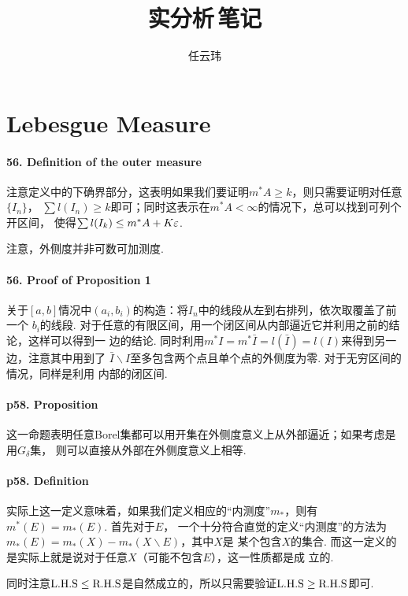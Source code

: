 

\title{实分析$\,$笔记}
\author{任云玮}
\date{}



\maketitle
\tableofcontents

\newpage
\setcounter{section}{2}
\section{Lebesgue Measure}
  \paragraph{56. Definition of the outer measure}
    注意定义中的下确界部分，这表明如果我们要证明$m^*A\ge k$，则只需要证明对任意$\{I_n\}$，
    $\sum l(I_n)\ge k$即可；同时这表示在$m^*A<\infty$的情况下，总可以找到可列个开区间，
    使得$\sum l(I_k) \le m^*A + K\varepsilon$.\par
    注意，外侧度并非可数可加测度. 

  \paragraph{56. Proof of Proposition 1}
    关于$[a,b]$情况中$(a_i,b_i)$的构造：将$I_n$中的线段从左到右排列，依次取覆盖了前一个
    $b_i$的线段. 对于任意的有限区间，用一个闭区间从内部逼近它并利用之前的结论，这样可以得到一
    边的结论. 同时利用$m^*I = m^*\bar{I}=l(\bar{I})=l(I)$来得到另一边，注意其中用到了
    $\bar{I}\backslash I$至多包含两个点且单个点的外侧度为零. 对于无穷区间的情况，同样是利用
    内部的闭区间. 

  \paragraph{p58. Proposition}
    这一命题表明任意Borel集都可以用开集在外侧度意义上从外部逼近；如果考虑是用$G_\delta$集，
    则可以直接从外部在外侧度意义上相等. 

  \paragraph{p58. Definition}
    实际上这一定义意味着，如果我们定义相应的“内测度”$m_*$，则有$m^*(E)=m_*(E)$. 首先对于$E$，
    一个十分符合直觉的定义“内测度”的方法为$m_*(E)=m_*(X)-m_*(X\backslash E)$，其中$X$是
    某个包含$X$的集合. 而这一定义的是实际上就是说对于任意$X$（可能不包含$E$），这一性质都是成
    立的. \par
    同时注意$\text{L.H.S}\le\text{R.H.S}$是自然成立的，所以只需要验证$\text{L.H.S}\ge\text{R.H.S}$即可. 

